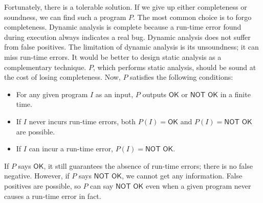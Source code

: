 



Fortunately, there is a tolerable solution. If we give up either completeness or
soundness, we can find such a program $P$. The most common choice is to forgo
completeness. Dynamic analysis is complete because a run-time error found
during execution always indicates a real bug. Dynamic analysis does not suffer
from false positives. The limitation of dynamic analysis is its unsoundness; it
can miss run-time errors. It would be better to design static analysis as a
complementary technique. $P$, which performs static analysis, should be sound at
the cost of losing completeness. Now, $P$ satisfies the following conditions:
\begin{itemize}
  \item For any given program $I$ as an input, $P$ outputs $\textsf{OK}$ or
    $\textsf{NOT OK}$ in a finite time.
  \item If $I$ never incurs run-time errors,
    both $P(I)=\textsf{OK}$ and $P(I)=\textsf{NOT OK}$ are possible.
  \item If $I$ can incur a run-time error, $P(I)=\textsf{NOT OK}$.
\end{itemize}
If $P$ says $\textsf{OK}$, it still guarantees the absence of run-time errors;
there is no false negative. However, if $P$ says $\textsf{NOT OK}$, we cannot
get any information. False positives are possible, so $P$ can say $\textsf{NOT
OK}$ even when a given program never causes a run-time error in fact.

